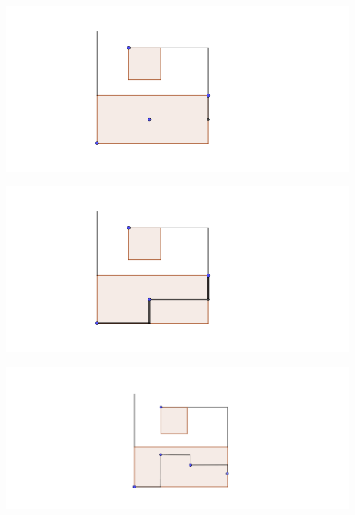 \documentclass{beamer}
\begin{document}
\begin{frame}
\begin{figure}[h]
\includegraphics[width=\textwidth]{Cajas-3-puntos-si-puede}
\end{figure}
\end{frame}
\begin{frame}
\begin{figure}[h]
\includegraphics[width=\textwidth]{Cajas-3-puntos-si-puede-2}
\end{figure}
\end{frame}
\begin{frame}
\begin{figure}[h]
\includegraphics[width=\textwidth]{Cajas-4-puntos}
\end{figure}
\end{frame}
\end{document}
